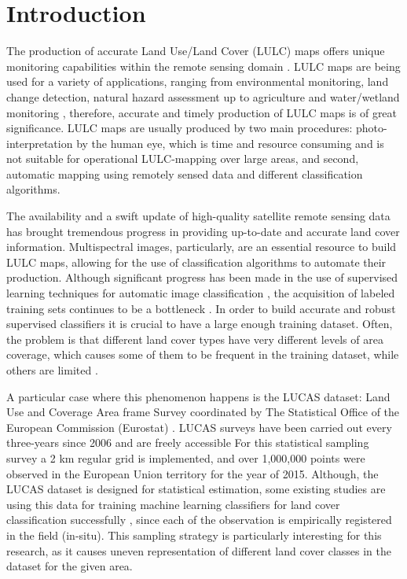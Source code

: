 \documentclass[remotesensing,article,submit,moreauthors,pdftex]{Definitions/mdpi}
\begin{document}
\section{Introduction}
The production of accurate Land Use/Land Cover (LULC) maps offers unique
monitoring capabilities within the remote sensing domain \cite{Mellor2015}. LULC
maps are being used for a variety of applications, ranging from environmental
monitoring, land change detection, natural hazard assessment up to agriculture
and water/wetland monitoring \cite{Khatami2016}, therefore, accurate and timely
production of LULC maps is of great significance. LULC maps are usually
produced by two main procedures: photo-interpretation by the human eye, which is
time and resource consuming and is not suitable for operational LULC-mapping
over large areas, and second, automatic mapping using remotely sensed data and
different classification algorithms.

The availability and a swift update of high-quality satellite remote sensing
data has brought tremendous progress in providing up-to-date and accurate land
cover information. Multispectral images, particularly, are an essential
resource to build LULC maps, allowing for the use of classification algorithms
to automate their production. Although significant progress has been made in
the use of supervised learning techniques for automatic image classification
\cite{Tewkesbury2015}, the acquisition of labeled training sets continues to be
a bottleneck \cite{Rajan2008}. In order to build accurate and robust supervised
classifiers it is crucial to have a large enough training dataset. Often, the
problem is that different land cover types have very different levels of area
coverage, which causes some of them to be frequent in the training dataset,
while others are limited \cite{Feng2019}.

A particular case where this phenomenon happens is the LUCAS dataset: Land Use
and Coverage Area frame Survey coordinated by The Statistical Office of the
European Commission (Eurostat) \cite{LUCAS2015C1}. LUCAS surveys have been
carried out every three-years since 2006 and are freely accessible  For this
statistical sampling survey a 2 km regular grid is implemented, and over
1,000,000 points were observed in the European Union territory for the year of
2015. Although, the LUCAS dataset is designed for  statistical estimation, some
existing studies are using this data for training machine learning classifiers
for land cover classification successfully \cite{Pflugmacher2019, Mack2017},
since each of the observation is empirically registered in the field (in-situ).
This sampling strategy is particularly interesting for this research, as it
causes uneven representation of different land cover classes in the dataset for
the given area.
\end{document}
